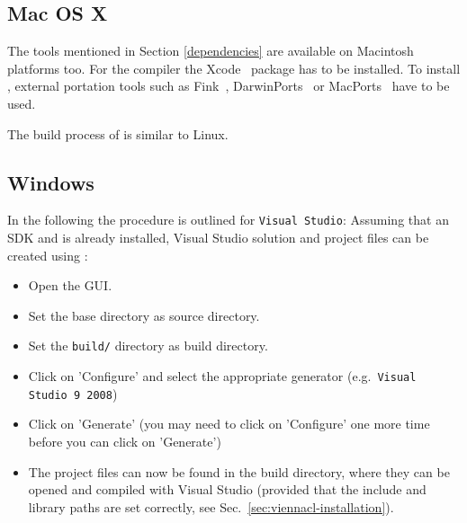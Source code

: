 
\subsection{Mac OS X}
\label{apple}
The tools mentioned in Section \ref{dependencies} are available on 
Macintosh platforms too. 
For the {\GCC} compiler the Xcode~\cite{xcode} package has to be installed.
To install {\CMake}, external portation tools such as
Fink~\cite{fink}, DarwinPorts~\cite{darwinports} 
or MacPorts~\cite{macports} have to be used. 

The build process of {\ViennaData} is similar to Linux.

\subsection{Windows}
In the following the procedure is outlined for \texttt{Visual Studio}: Assuming
that an {\OpenCL} SDK and {\CMake} is already installed, Visual Studio solution
and project files can be created using {\CMake}:
\begin{itemize}
\item Open the {\CMake} GUI.
\item Set the {\ViennaData} base directory as source directory.
\item Set the \texttt{build/} directory as build directory.
\item Click on 'Configure' and select the appropriate generator
(e.g.~\texttt{Visual Studio 9 2008})
\item Click on 'Generate' (you may need to click on 'Configure' one more time
before you can click on 'Generate')
\item The project files can now be found in the {\ViennaData} build directory,
where they can be opened and compiled with Visual Studio (provided that the
include and library paths are set correctly, see
Sec.~\ref{sec:viennacl-installation}).
\end{itemize}


























